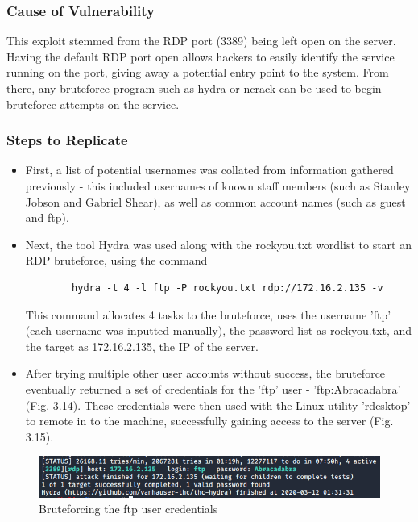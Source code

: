 \documentclass{report}
\begin{document}
\subsubsection{Cause of Vulnerability}
This exploit stemmed from the RDP port (3389) being left open on the server. Having the default RDP port open allows hackers to easily identify the service running on the port, giving away a potential entry point to the system. From there, any bruteforce program such as hydra or ncrack can be used to begin bruteforce attempts on the service.
\subsubsection{Steps to Replicate}
\begin{itemize}
	\item First, a list of potential usernames was collated from information gathered previously - this included usernames of known staff members (such as Stanley Jobson and Gabriel Shear), as well as common account names (such as guest and ftp). 
	\item Next, the tool Hydra was used along with the rockyou.txt wordlist to start an RDP bruteforce, using the command 
	\begin{verbatim}
		hydra -t 4 -l ftp -P rockyou.txt rdp://172.16.2.135 -v
	\end{verbatim}
	This command allocates 4 tasks to the bruteforce, uses the username 'ftp' (each username was inputted manually), the password list as rockyou.txt, and the target as 172.16.2.135, the IP of the server.
	\item After trying multiple other user accounts without success, the bruteforce eventually returned a set of credentials for the 'ftp' user - 'ftp:Abracadabra' (Fig. 3.14). These credentials were then used with the Linux utility 'rdesktop' to remote in to the machine, successfully gaining access to the server (Fig. 3.15).
\end{itemize}
\begin{figure}[!htb]
	\centering
	\includegraphics[scale=0.6]{img/rdp1.png}
	\caption{Bruteforcing the ftp user credentials}
\end{figure}
\end{document}
